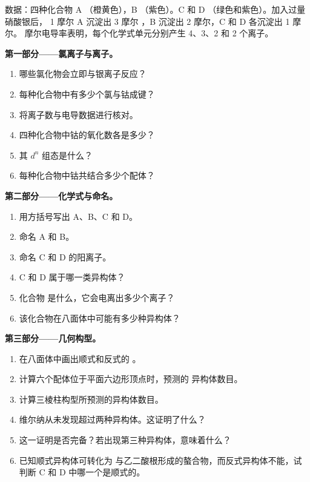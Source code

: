 \begin{problem}
\label{pb:b2:coordination-complexes:1}
数据：四种化合物 A （橙黄色），B 
（紫色）。C 和 D （绿色和紫色）。加入过量硝酸银后，
1 摩尔 A 沉淀出 3 摩尔 ，B 沉淀出 2 摩尔，C 和 D 各沉淀出 1 摩尔。
摩尔电导率表明，每个化学式单元分别产生 4、3、2 和 2 个离子。

\medskip
\noindent\textbf{第一部分——氯离子与离子。}
\begin{enumerate}
  \item 哪些氯化物会立即与银离子反应？
  \item 每种化合物中有多少个氯与钴成键？
  \item 将离子数与电导数据进行核对。
  \item 四种化合物中钴的氧化数各是多少？
  \item 其 $d^n$ 组态是什么？
  \item 每种化合物中钴共结合多少个配体？
\end{enumerate}

\medskip
\noindent\textbf{第二部分——化学式与命名。}
\begin{enumerate}[resume]
  \item 用方括号写出 A、B、C 和 D。
  \item 命名 A 和 B。
  \item 命名 C 和 D 的阳离子。
  \item C 和 D 属于哪一类异构体？
  \item 化合物  是什么，它会电离出多少个离子？
  \item 该化合物在八面体中可能有多少种异构体？
\end{enumerate}

\medskip
\noindent\textbf{第三部分——几何构型。}
\begin{enumerate}[resume]
  \item 在八面体中画出顺式和反式的 \ce{[CoCl2(NH3)4]+}。
  \item 计算六个配体位于平面六边形顶点时，预测的
        \ce{[CoCl2(NH3)4]+} 异构体数目。
  \item 计算三棱柱构型所预测的异构体数目。
  \item 维尔纳从未发现超过两种异构体。这证明了什么？
  \item 这一证明是否完备？若出现第三种异构体，意味着什么？
  \item 已知顺式异构体可转化为
        与乙二酸根形成的螯合物，而反式异构体不能，试判断 C 和 D 中哪一个是顺式的。
\end{enumerate}


\end{problem}
